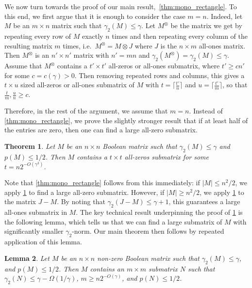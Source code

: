 \documentclass[11pt]{amsart}
\theoremstyle{plain}
\newtheorem{theorem}{Theorem}[section]
\newtheorem{lemma}[theorem]{Lemma}
\theoremstyle{definition}
\begin{document}
We now turn towards the proof of our main result,~\cref{thm:mono_rectangle}. To this end, we first argue that it is enough to consider the case $m=n$. Indeed, let $M$ be an $m\times n$ matrix such that $\gamma_2(M)\leq \gamma$. Let $M^{\otimes}$ be the matrix we get by repeating every row of $M$ exactly $n$ times and then repeating every column of the resulting matrix $m$ times, i.e.\ $M^{\otimes} = M \otimes J$ where $J$ is the $n \times m$ all-ones matrix. Then $M^{\otimes}$ is an $n'\times n'$ matrix with $n'=mn$ and $\gamma_2(M^{\otimes})=\gamma_2(M)\leq \gamma$. Assume that $M^{\otimes}$ contains a $t'\times t'$ all-zeros or all-ones submatrix, where $t'\geq cn'$ for some $c=c(\gamma)>0$. Then removing repeated rows and columns, this gives a $t\times u$ sized all-zeros or all-ones submatrix of $M$ with $t=\lceil\frac{t'}{n}\rceil$ and $u=\lceil\frac{t'}{m}\rceil$, so that $\frac{t}{m},\frac{u}{n}\geq c$.

Therefore, in the rest of the argument, we assume that $m=n$. Instead of \cref{thm:mono_rectangle}, we prove the slightly stronger result that if at least half of the entries are zero, then one can find a large all-zero submatrix.

\begin{theorem}\label{thm:all_zero}
     Let $M$ be an $n\times n$ Boolean matrix such that $\gamma_2(M)\leq \gamma$ and $p(M)\leq 1/2$. Then $M$ contains a $t\times t$ all-zeros submatrix for some $t=n2^{-O(\gamma^3)}$.
\end{theorem}

Note that \cref{thm:mono_rectangle} follows from this immediately: if $|M|\leq n^2/2$, we apply \cref{thm:all_zero} to find a large all-zero submatrix. However, if $|M|\geq n^2/2$, we apply \cref{thm:all_zero} to the matrix $J-M$. By noting that $\gamma_2(J-M)\leq \gamma+1$, this guarantees a large all-ones submatrix in $M$. The key technical result underpinning the proof of \cref{thm:all_zero} is the following lemma, which tells us that we can find a large submatrix of $M$ with significantly smaller $\gamma_2$-norm. Our main theorem then follows by repeated application of this lemma.

\begin{lemma}\label{lemma:main}
    Let $M$ be an $n\times n$ non-zero Boolean matrix such that $\gamma_2(M)\leq \gamma$, and $p(M)\leq 1/2$. Then $M$ contains an $m\times m$ submatrix $N$ such that $\gamma_2(N)\leq \gamma-\Omega(1/\gamma)$, $m\geq n2^{-O(\gamma)}$, and $p(N)\leq 1/2$.
\end{lemma}
\end{document}
